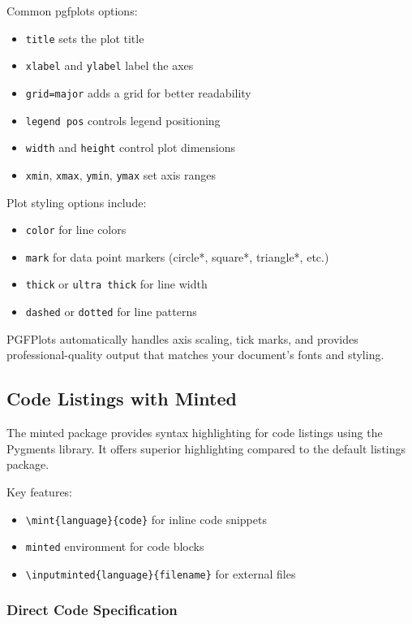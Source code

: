 Common pgfplots options:
\begin{itemize}
    \item \verb+title+ sets the plot title
    \item \verb+xlabel+ and \verb+ylabel+ label the axes
    \item \verb+grid=major+ adds a grid for better readability
    \item \verb+legend pos+ controls legend positioning
    \item \verb+width+ and \verb+height+ control plot dimensions
    \item \verb+xmin+, \verb+xmax+, \verb+ymin+, \verb+ymax+ set axis ranges
\end{itemize}

Plot styling options include:
\begin{itemize}
    \item \verb+color+ for line colors
    \item \verb+mark+ for data point markers (circle*, square*, triangle*, etc.)
    \item \verb+thick+ or \verb+ultra thick+ for line width
    \item \verb+dashed+ or \verb+dotted+ for line patterns
\end{itemize}

PGFPlots automatically handles axis scaling, tick marks, and provides professional-quality output that matches your document's fonts and styling.

\subsection{Code Listings with Minted}

The minted package provides syntax highlighting for code listings using the Pygments library. It offers superior highlighting compared to the default listings package.

Key features:
\begin{itemize}
    \item \verb+\mint{language}{code}+ for inline code snippets
    \item \verb+minted+ environment for code blocks
    \item \verb+\inputminted{language}{filename}+ for external files
\end{itemize}

\subsubsection{Direct Code Specification}

